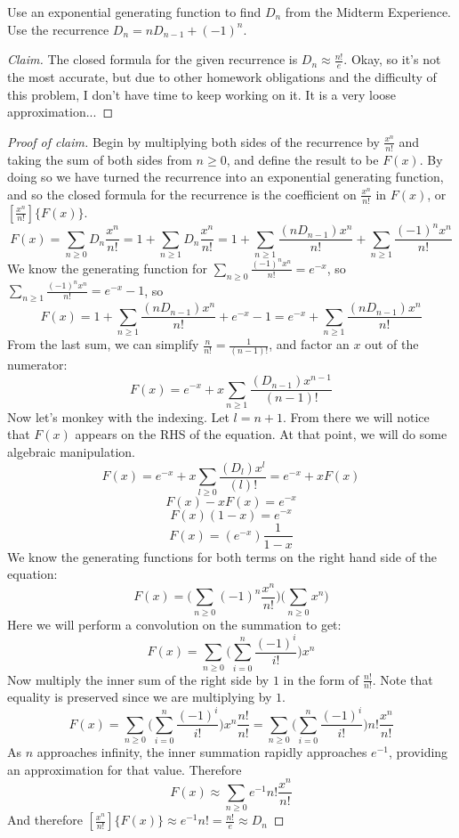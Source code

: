 \documentclass[12pt]{article}
\newenvironment{problem}[2][Problem]{\begin{trivlist}
\item[\hskip \labelsep {\bfseries #1}\hskip \labelsep {\bfseries #2.}]}{\end{trivlist}}
\begin{document}
\begin{problem}{2}
Use an exponential generating function to find $D_n$  from the Midterm Experience. Use the recurrence $D_n = nD_{n-1}+(-1)^n$.
\end{problem}
 
\begin{proof}[Claim]
The closed formula for the given recurrence is $D_n \approx \frac{n!}{e}$. Okay, so it's not the most accurate, but due to other homework obligations and the difficulty of this problem, I don't have time to keep working on it. It is a very loose approximation... 
\end{proof}

\begin{proof}[Proof of claim]
Begin by multiplying both sides of the recurrence by $\frac{x^n}{n!}$ and taking the sum of both sides from $n \geq 0$, and define the result to be $F(x)$. By doing so we have turned the recurrence into an exponential generating function, and so the closed formula for the recurrence is the coefficient on $\frac{x^n}{n!}$ in $F(x)$, or $[\frac{x^n}{n!}]\{F(x)\}$.
\[F(x)=\sum_{n \geq 0}D_n\frac{x^n}{n!}=1+\sum_{n \geq 1}D_n\frac{x^n}{n!} =1+\sum_{n \geq 1}\frac{(nD_{n-1})x^n}{n!}+\sum_{n \geq 1}\frac{(-1)^nx^n}{n!}\]
We know the generating function for $\sum_{n \geq 0}\frac{(-1)^nx^n}{n!}= e^{-x}$, so $\sum_{n \geq 1}\frac{(-1)^nx^n}{n!}= e^{-x}-1$, so
\[F(x)=1+\sum_{n \geq 1}\frac{(nD_{n-1})x^n}{n!} +e^{-x}-1=e^{-x} + \sum_{n \geq 1}\frac{(nD_{n-1})x^n}{n!}\]
From the last sum, we can simplify $\frac{n}{n!} = \frac{1}{(n-1)!}$, and factor an $x$ out of the numerator:
\[F(x)=e^{-x} + x\sum_{n \geq 1}\frac{(D_{n-1})x^{n-1}}{(n-1)!}\]
Now let's monkey with the indexing. Let $l = n +1$. From there we will notice that $F(x)$ appears on the RHS of the equation. At that point, we will do some algebraic manipulation.
\[F(x)=e^{-x} + x\sum_{l \geq 0}\frac{(D_{l})x^{l}}{(l)!} = e^{-x}+xF(x)\]
\[F(x)-xF(x)=e^{-x}\]
\[F(x)(1-x)=e^{-x}\]
\[F(x)=(e^{-x})\frac{1}{1-x}\]
We know the generating functions for both terms on the right hand side of the equation:
\[F(x)=\bigg(\sum_{n \geq 0}(-1)^n\frac{x^n}{n!} \bigg) \bigg(\sum_{n \geq 0}x^n\bigg)\]
Here we will perform a convolution on the summation to get:
\[F(x)=\sum_{n \geq 0}\bigg(\sum_{i = 0}^n \frac{(-1)^i}{i!}\bigg)x^n\]
Now multiply the inner sum of the right side by $1$ in the form of $\frac{n!}{n!}$. Note that equality is preserved since we are multiplying by $1$.
\[F(x)=\sum_{n \geq 0}\bigg(\sum_{i = 0}^n \frac{(-1)^i}{i!}\bigg)x^n \frac{n!}{n!}=\sum_{n \geq 0}\bigg(\sum_{i = 0}^n \frac{(-1)^i}{i!}\bigg)n! \frac{x^n}{n!}\]
As $n$ approaches infinity, the inner summation rapidly approaches $e^{-1}$, providing an approximation for that value. Therefore
\[F(x)\approx\sum_{n \geq 0} e^{-1}n!\frac{x^n}{n!}\]
And therefore $[\frac{x^n}{n!}]\{F(x)\}\approx e^{-1}n!=\frac{n!}{e} \approx D_n$
\end{proof}
\end{document}
